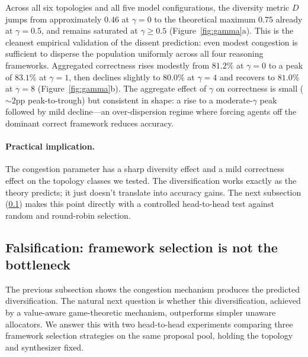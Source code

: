 \documentclass[11pt]{amsart}
\newcommand{\g}{\gamma}
\newcommand\1{{\mathds{1}}}
\theoremstyle{definition}
\theoremstyle{remark}
\numberwithin{equation}{section}
\begin{document}
Across all six topologies and all five model configurations, the diversity metric $D$ jumps from approximately $0.46$ at $\g = 0$ to the theoretical maximum $0.75$ already at $\g = 0.5$, and remains saturated at $\g \ge 0.5$ (Figure~\ref{fig:gamma}a).
This is the cleanest empirical validation of the dissent prediction: even modest congestion is sufficient to disperse the population uniformly across all four reasoning frameworks.
Aggregated correctness rises modestly from $81.2\%$ at $\g = 0$ to a peak of $83.1\%$ at $\g = 1$, then declines slightly to $80.0\%$ at $\g = 4$ and recovers to $81.0\%$ at $\g = 8$ (Figure~\ref{fig:gamma}b).
The aggregate effect of $\g$ on correctness is small ($\sim 2$pp peak-to-trough) but consistent in shape: a rise to a moderate-$\g$ peak followed by mild decline---an over-dispersion regime where forcing agents off the dominant correct framework reduces accuracy.

\paragraph{Practical implication.}
The congestion parameter has a sharp diversity effect and a mild correctness effect on the topology classes we tested.
The diversification works exactly as the theory predicts; it just doesn't translate into accuracy gains.
The next subsection (\ref{sec:results-falsification}) makes this point directly with a controlled head-to-head test against random and round-robin selection.

\subsection{Falsification: framework selection is not the bottleneck}\label{sec:results-falsification}

The previous subsection shows the congestion mechanism produces the predicted diversification.
The natural next question is whether this diversification, achieved by a value-aware game-theoretic mechanism, outperforms simpler unaware allocators.
We answer this with two head-to-head experiments comparing three framework selection strategies on the same proposal pool, holding the topology and synthesizer fixed.
\end{document}
